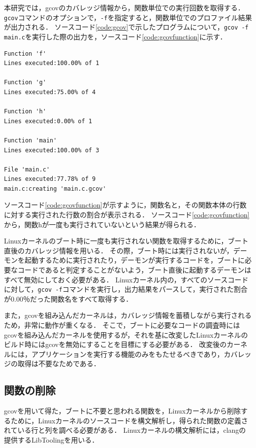 \documentclass[graduation-thesis]{mlarticle}
\begin{document}
本研究では，gcovのカバレッジ情報から，関数単位での実行回数を取得する．
\texttt{gcov}コマンドのオプションで，\texttt{-f}を指定すると，関数単位でのプロファイル結果が出力される．
ソースコード\ref{code:gcov}で示したプログラムについて，\texttt{gcov -f main.c}を実行した際の出力を，ソースコード\ref{code:gcovfunction}に示す．

\begin{lstlisting}[caption=関数単位でのプロファイル結果, label=code:gcovfunction]
% gcov -f main.c
Function 'f'
Lines executed:100.00% of 1

Function 'g'
Lines executed:75.00% of 4

Function 'h'
Lines executed:0.00% of 1

Function 'main'
Lines executed:100.00% of 3

File 'main.c'
Lines executed:77.78% of 9
main.c:creating 'main.c.gcov'
\end{lstlisting}

ソースコード\ref{code:gcovfunction}が示すように，関数名と，その関数本体の行数に対する実行された行数の割合が表示される．
ソースコード\ref{code:gcovfunction}から，関数hが一度も実行されていないという結果が得られる．

Linuxカーネルのブート時に一度も実行されない関数を取得するために，ブート直後のカバレッジ情報を用いる．
その際，ブート時には実行されないが，デーモンを起動するために実行されたり，デーモンが実行するコードを，ブートに必要なコードであると判定することがないよう，ブート直後に起動するデーモンはすべて無効にしておく必要がある．
Linuxカーネル内の，すべてのソースコードに対して，\texttt{gcov -f}コマンドを実行し，出力結果をパースして，実行された割合が0.00％だった関数名をすべて取得する．

また，gcovを組み込んだカーネルは，カバレッジ情報を蓄積しながら実行されるため，非常に動作が重くなる．
そこで，ブートに必要なコードの調査時にはgcovを組み込んだカーネルを使用するが，それを基に改変したLinuxカーネルのビルド時にはgcovを無効にすることを目標にする必要がある．
改変後のカーネルには，アプリケーションを実行する機能のみをもたせるべきであり，カバレッジの取得は不要なためである．

\subsection{関数の削除}
\label{implementation:function}
gcovを用いて得た，ブートに不要と思われる関数を，Linuxカーネルから削除するために，Linuxカーネルのソースコードを構文解析し，得られた関数の定義されている行と列を調べる必要がある．
Linuxカーネルの構文解析には，clang\cite{clang}の提供するLibToolingを用いる．
\end{document}
